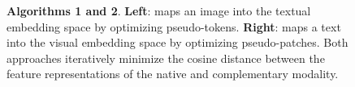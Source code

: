 \begin{figure}[t]
    \caption{\textbf{Algorithms 1 and 2}. \textbf{Left}:  maps an image into the textual embedding space by optimizing pseudo-tokens. \textbf{Right}:  maps a text into the visual embedding space by optimizing pseudo-patches. Both approaches iteratively minimize the cosine distance between the feature representations of the native and complementary modality.}
\end{figure}